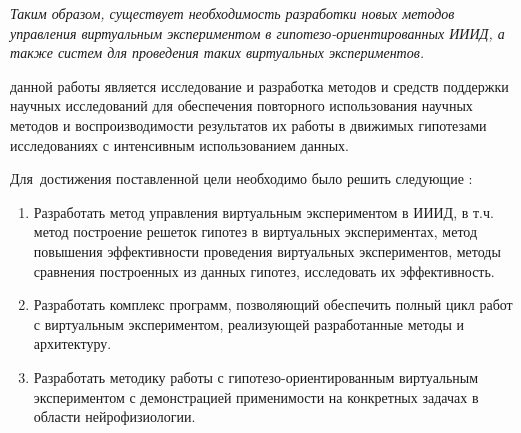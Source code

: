 \textit{Таким образом, существует необходимость разработки новых методов управления виртуальным экспериментом 
 в гипотезо-ориентированных ИИИД, а также систем для проведения таких виртуальных экспериментов.}
 




{\aim} данной работы является исследование и разработка методов и средств поддержки научных 
исследований для обеспечения повторного использования научных методов и воспроизводимости результатов 
их работы в движимых гипотезами исследованиях с интенсивным использованием данных.


Для~достижения поставленной цели необходимо было решить следующие {\tasks}:
\begin{enumerate}[beginpenalty=10000] %
    \item Разработать метод управления виртуальным экспериментом в ИИИД, в т.ч. метод построение решеток 
            гипотез в виртуальных экспериментах, метод повышения эффективности проведения виртуальных 
            экспериментов, методы сравнения построенных из данных гипотез, исследовать их эффективность.
    \item Разработать комплекс программ, позволяющий обеспечить полный цикл работ с виртуальным экспериментом, 
            реализующей разработанные методы и архитектуру.
    \item Разработать методику работы с гипотезо-ориентированным виртуальным экспериментом с демонстрацией 
            применимости на конкретных задачах в области нейрофизиологии.
\end{enumerate}


